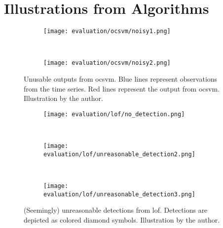 \section{Illustrations from Algorithms}

\begin{figure}[htp!]
    \begin{subfigure}[b]{\linewidth}
        \centering
        \texttt{[image: evaluation/ocsvm/noisy1.png]}
    \end{subfigure}%
    \\
    \begin{subfigure}[b]{\linewidth}
        \centering
        \texttt{[image: evaluation/ocsvm/noisy2.png]}
    \end{subfigure}
    \caption{Unusable outputs from \gls{ocsvm}. Blue lines represent observations
    from the time series. Red lines represent the output from \gls{ocsvm}.
    Illustration by the author.}\label{fig:ocsvm-output}
\end{figure}

\begin{figure}[htp!]
    \begin{subfigure}[b]{\linewidth}
        \centering
        \texttt{[image: evaluation/lof/no\_detection.png]}
    \end{subfigure}%
    \\
    \begin{subfigure}[b]{\linewidth}
        \centering
        \texttt{[image: evaluation/lof/unreasonable\_detection2.png]}
    \end{subfigure}
    \\
    \begin{subfigure}[b]{\linewidth}
        \centering
        \texttt{[image: evaluation/lof/unreasonable\_detection3.png]}
    \end{subfigure}
    \caption{(Seemingly) unreasonable detections from \gls{lof}. Detections are
    depicted as colored diamond symbols. Illustration by the author.}\label{fig:lof-output}
\end{figure}


